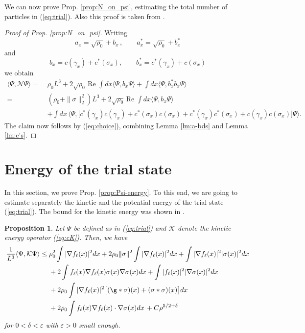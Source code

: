 \documentclass[a4paper,11pt]{article}
\def\cK{\mathcal{K}}
\def\eps{\varepsilon}
\def\ph{\varphi}
\newtheorem{proposition}[theorem]{Proposition}
\numberwithin{equation}{section}
\let\s=\sigma \let\t=\tau     \let\f=\phi    \let\ph=\varphi   \let\c=\chi
\begin{document}
We can now prove Prop. \ref{prop:N_on_psi}, estimating the total number of particles in (\ref{eq:trial}). Also this proof is taken from \cite{BBCOS}. 
\begin{proof}[Proof of Prop. \ref{prop:N_on_psi}] 
Writing  
\begin{equation} \label{eq:a_to_b}
a_x = \sqrt{\rho_0} + b_x\,, \qquad a_x^* = \sqrt{\rho_0} + b_x^*
\end{equation} 
and 
\[ b_x = c (\gamma_x) + c^* (\sigma_x), \qquad b_x^* = c^* (\gamma_x) + c (\sigma_x) \]
we obtain 
\[ \begin{split}  \langle\Psi ,\mathcal{N} \Psi\rangle =\; &\rho_0 L^3 +  2\sqrt{\rho_0} \, \text{Re } \int dx \langle \Psi, b_x \Psi \rangle + \int dx \langle \Psi, b_x^* b_x \Psi \rangle 
\\ =\;&(\rho_0 + \| \sigma \|_2^2) L^3 +  2 \sqrt{\rho_0} \, \text{Re } \int dx \langle \Psi, b_x \Psi \rangle \\ &+ \int dx\, \langle\Psi, \Big[ c^*(\gamma_x) c(\gamma_x)+ c^*(\sigma_x) c(\sigma_x)+c^*(\gamma_x) c^*(\sigma_x)+c(\gamma_x) c(\sigma_x)\Big]\Psi\rangle. \end{split} \]
The claim now follows by (\ref{eq:choice}), combining Lemma \ref{lm:a-bds} and Lemma \ref{lm:c's}. 
\end{proof} 


\section{Energy of the trial state} 

In this section, we prove Prop. \ref{prop:Psi-energy}. To this end, we are going to estimate separately the kinetic and the potential energy of the trial state (\ref{eq:trial}). The bound for the kinetic energy was shown in  \cite[Prop. 2.5]{BBCOS}.
\begin{proposition}\label{prop:kin}
Let $\Psi$ be defined as in (\ref{eq:trial}) and $\cK$ denote the kinetic energy operator (\ref{eq:cK}). Then, we have 
\begin{equation}\label{eq:Kpsi} \begin{split} \frac{1}{L^3} \langle \Psi, \cK \Psi \rangle \leq \; &\rho_0^2 \int |\nabla f_\ell(x)|^2 dx  + 2\rho_0 \|\s\|^2  \int |\nabla f_\ell(x)|^2 dx  + \int |\nabla f_\ell (x)|^2 |\sigma (x)|^2 dx \\ &+ 2\int f_\ell (x) \nabla f_\ell (x) \sigma (x) \nabla \sigma (x) dx  +  \int |f_\ell(x)|^2 |\nabla \s(x)|^2 dx \\	& + 2\rho_0 \int |\nabla f_\ell(x)|^2 \big[(\g \ast \s)(x) + (\s \ast \s)(x)\big] dx \\
& + 2\rho_0 \int  f_\ell(x) \nabla f_\ell(x) \cdot \nabla \s (x)  dx\, + C \rho^{5/2+\delta}
\end{split}\end{equation} 
for $0 < \delta < \eps$ with $\eps > 0$ small enough.
\end{proposition}
\end{document}
